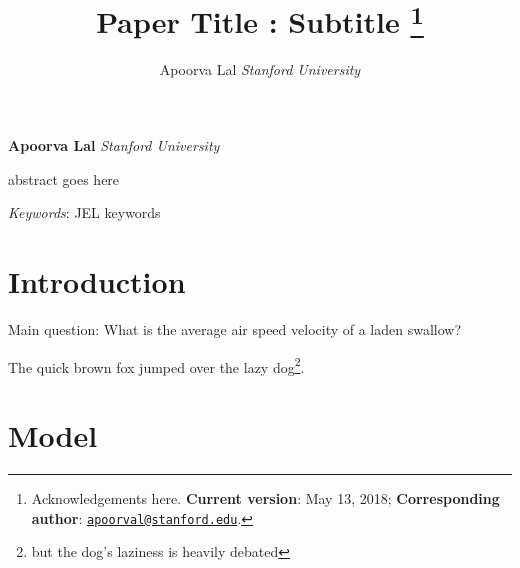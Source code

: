 \documentclass[12pt,]{article}
\title{Paper Title : Subtitle \thanks{Acknowledgements here. \textbf{Current version}: May 13, 2018;
\textbf{Corresponding author}:
\href{mailto:apoorval@stanford.edu}{\nolinkurl{apoorval@stanford.edu}}.}  }
\author{\Large Apoorva Lal\vspace{0.05in} \newline\normalsize\emph{Stanford University}  }
\date{}
\renewenvironment{abstract}
 {{%
    \setlength{\leftmargin}{0mm}
    \setlength{\rightmargin}{\leftmargin}%
  }%
  \relax}
 {\endlist}
\begin{document}
%



\maketitle

{%
\thispagestyle{plain}
{ \selectfont
\maketitle  %
}

\begin{center}
{
   \vskip 13.5pt\relax \normalsize\fontsize{14}{14}
\textbf{Apoorva Lal} \hskip 15pt \emph{\small Stanford University}   
}
\end{center}
}





\begin{abstract}

    \hbox{\vrule height .2pt width 39.14pc}

    \vskip 8.5pt %

\noindent abstract goes here


\vskip 8.5pt \noindent \emph{Keywords}: JEL keywords \par

    \hbox{\vrule height .2pt width 39.14pc}



\end{abstract}


\vskip 6.5pt

{
\hypersetup{linkcolor=black}
\setcounter{tocdepth}{3}
\tableofcontents
}

\newpage


\noindent \doublespacing \hypertarget{introduction}{%
\section{Introduction}\label{introduction}}

Main question: What is the average air speed velocity of a laden
swallow?

\textcite{Deatonanalysishouseholdsurveys1997}

The quick brown fox jumped over the lazy dog\footnote{but the dog's
  laziness is heavily debated}.

\hypertarget{model}{%
\section{Model}\label{model}}
\end{document}
